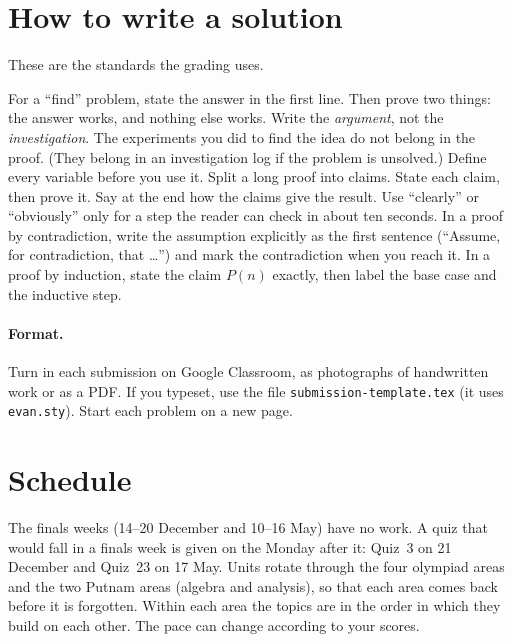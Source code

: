 \documentclass[11pt]{scrartcl}
\begin{document}
\section{How to write a solution}
These are the standards the grading uses.
\begin{enumerate}
  \ii For a ``find'' problem, state the answer in the first line. Then prove two things:
  the answer works, and nothing else works.
  \ii Write the \emph{argument}, not the \emph{investigation}. The experiments you did to find the idea
  do not belong in the proof. (They belong in an investigation log if the problem is unsolved.)
  \ii Define every variable before you use it.
  \ii Split a long proof into claims. State each claim, then prove it.
  Say at the end how the claims give the result.
  \ii Use ``clearly'' or ``obviously'' only for a step the reader can check in about ten seconds.
  \ii In a proof by contradiction, write the assumption explicitly as the first sentence
  (``Assume, for contradiction, that \ldots'') and mark the contradiction when you reach it.
  \ii In a proof by induction, state the claim $P(n)$ exactly, then label the base case and the inductive step.
\end{enumerate}

\paragraph{Format.}
Turn in each submission on Google Classroom, as photographs of handwritten work or as a PDF.
If you typeset, use the file \texttt{submission-template.tex} (it uses \texttt{evan.sty}).
Start each problem on a new page.

\section{Schedule}
The finals weeks (14--20 December and 10--16 May) have no work. A quiz that would fall in a finals week
is given on the Monday after it: Quiz~3 on 21 December and Quiz~23 on 17 May.
Units rotate through the four olympiad areas and the two Putnam areas (algebra and analysis),
so that each area comes back before it is forgotten. Within each area the topics are in the order
in which they build on each other. The pace can change according to your scores.
\end{document}
